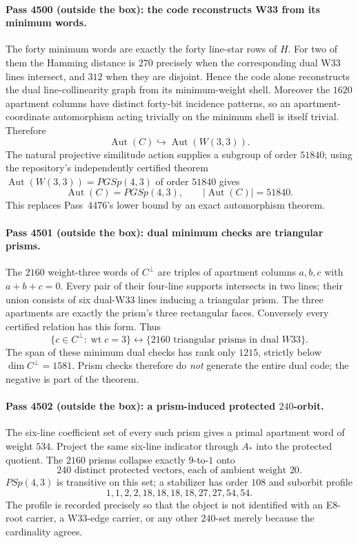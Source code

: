 \paragraph{Pass 4500 (outside the box): the code reconstructs W33 from its minimum words.}
The forty minimum words are exactly the forty line-star rows of $H$.  For two of
them the Hamming distance is $270$ precisely when the corresponding dual W33
lines intersect, and $312$ when they are disjoint.  Hence the code alone
reconstructs the dual line-collinearity graph from its minimum-weight shell.
Moreover the $1620$ apartment columns have distinct forty-bit incidence patterns,
so an apartment-coordinate automorphism acting trivially on the minimum shell is
itself trivial.  Therefore
\[
  \operatorname{Aut}(C)\hookrightarrow\operatorname{Aut}(W(3,3)).
\]
The natural projective similitude action supplies a subgroup of order $51840$;
using the repository's independently certified theorem
$\operatorname{Aut}(W(3,3))=PGSp(4,3)$ of order $51840$ gives
\[
  \boxed{\operatorname{Aut}(C)=PGSp(4,3),\qquad |\operatorname{Aut}(C)|=51840.}
\]
This replaces Pass~4476's lower bound by an exact automorphism theorem.

\paragraph{Pass 4501 (outside the box): dual minimum checks are triangular prisms.}
The $2160$ weight-three words of $C^\perp$ are triples of apartment columns
$a,b,c$ with $a+b+c=0$.  Every pair of their four-line supports intersects in
two lines; their union consists of six dual-W33 lines inducing a triangular
prism.  The three apartments are exactly the prism's three rectangular faces.
Conversely every certified relation has this form.  Thus
\[
  \boxed{\{c\in C^\perp:\operatorname{wt}c=3\}
  \longleftrightarrow\{2160\text{ triangular prisms in dual }W33\}.}
\]
The span of these minimum dual checks has rank only $1215$, strictly below
$\dim C^\perp=1581$.  Prism checks therefore do \emph{not} generate the entire
dual code; the negative is part of the theorem.

\paragraph{Pass 4502 (outside the box): a prism-induced protected $240$-orbit.}
The six-line coefficient set of every such prism gives a primal apartment word
of weight $534$.  Project the same six-line indicator through $A_*$ into the
protected quotient.  The $2160$ prisms collapse exactly $9$-to-$1$ onto
\[
  \boxed{240\text{ distinct protected vectors, each of ambient weight }20.}
\]
$PSp(4,3)$ is transitive on this set; a stabilizer has order $108$ and suborbit
profile
\[
  \boxed{1,1,2,2,18,18,18,18,27,27,54,54.}
\]
The profile is recorded precisely so that the object is not identified with an
E8-root carrier, a W33-edge carrier, or any other $240$-set merely because the
cardinality agrees.

